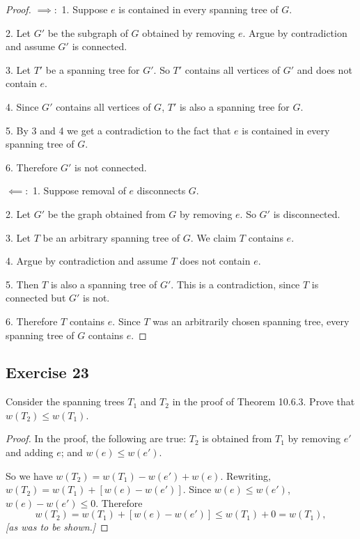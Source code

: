 \documentclass[14pt]{extarticle}
\begin{document}
\begin{proof}
\(\bm{\implies:}\) 1. Suppose \(e\) is contained in every spanning tree of \(G\). 

2. Let \(G'\) be the subgraph of \(G\) obtained by removing \(e\). Argue by contradiction and assume \(G'\) is connected.

3. Let \(T'\) be a spanning tree for \(G'\). So \(T'\) contains all vertices of \(G'\) and does not contain \(e\).

4. Since \(G'\) contains all vertices of \(G\), \(T'\) is also a spanning tree for \(G\).

5. By 3 and 4 we get a contradiction to the fact that \(e\) is contained in every spanning tree of \(G\).

6. Therefore \(G'\) is not connected.

\(\bm{\impliedby:}\) 1. Suppose removal of \(e\) disconnects \(G\). 

2. Let \(G'\) be the graph obtained from \(G\) by removing \(e\). So \(G'\) is disconnected.

3. Let \(T\) be an arbitrary spanning tree of \(G\). We claim \(T\) contains \(e\).

4. Argue by contradiction and assume \(T\) does not contain \(e\). 

5. Then \(T\) is also a spanning tree of \(G'\). This is a contradiction, since \(T\) is connected but \(G'\) is not.

6. Therefore \(T\) contains \(e\). Since \(T\) was an arbitrarily chosen spanning tree, every spanning tree of \(G\)
contains \(e\).
\end{proof}

\subsection{Exercise 23}
Consider the spanning trees \(T_1\) and \(T_2\) in the proof of Theorem 10.6.3. Prove that \(w(T_2) \leq w(T_1)\).

\begin{proof}
In the proof, the following are true: \(T_2\) is obtained from \(T_1\) by removing \(e'\) and adding \(e\); and 
\(w(e) \leq w(e')\).

So we have \(w(T_2) = w(T_1) - w(e') + w(e)\). Rewriting, \(w(T_2) = w(T_1) + [w(e)- w(e')]\). Since \(w(e) \leq w(e')\),
\(w(e) - w(e') \leq 0\). Therefore 
\[
w(T_2) = w(T_1) + [w(e) - w(e')] \leq w(T_1) + 0 = w(T_1),
\]
{\it [as was to be shown.]}
\end{proof}
\end{document}
